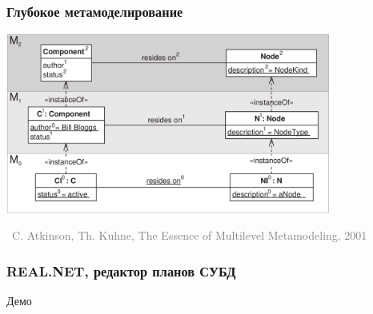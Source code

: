 \documentclass[xetex,mathserif,serif]{beamer}
\newcommand{\attribution}[1] {
    \vspace{-5mm}\begin{flushright}\begin{scriptsize}\textcolor{gray}{\textcopyright\, #1}\end{scriptsize}\end{flushright}
}
\begin{document}
    \begin{frame}
        \frametitle{Глубокое метамоделирование}
        \begin{center}
            \includegraphics[width=0.8\textwidth]{pictures/deepComponents.png}
            \attribution{C. Atkinson, Th. Kuhne, The Essence of Multilevel Metamodeling, 2001}
        \end{center}
    \end{frame}

    \begin{frame}
        \frametitle{REAL.NET, редактор планов СУБД}
        \begin{center}
            \Large Демо
        \end{center}
    \end{frame}
\end{document}

